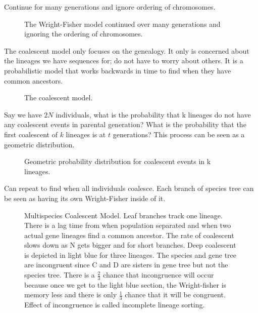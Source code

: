 \noindent Continue for many generations and ignore ordering of chromosomes.

\begin{figure} [ht!] 
  \centering 
  \caption{The Wright-Fisher model continued over many generations and
    ignoring the ordering of chromosomes.}
  \label{Fig14_FisherWrightManyGenerations}
\end{figure} 

The coalescent model only focuses on the genealogy. It only is
concerned about the lineages we have sequences for; do not have to
worry about others. It is a probabilistic model that works backwards
in time to find when they have common ancestors.

\begin{figure} [ht!] 
  \centering 
  \caption{The coalescent model.}
  \label{Fig15_CoalescentModel}
\end{figure} 

Say we have $2N$ individuals, what is the probability that k lineages
do not have any coalescent events in parental generation? What is the
probability that the first coalescent of $k$ lineages is at $t$
generations? This process can be seen as a geometric distribution.

\begin{figure} [ht!] 
  \centering 
  \caption{Geometric probability distribution for coalescent events in k lineages.}
  \label{Fig16_CoalescentProbDist}
\end{figure} 

\noindent Can repeat to find when all individuals coalesce. Each
branch of species tree can be seen as having its own Wright-Fisher
inside of it.

\begin{figure} [ht!] 
  \centering 
  \caption{Multispecies Coalescent Model. Leaf branches track one
    lineage. There is a lag time from when population separated and
    when two actual gene lineages find a common ancestor. The rate of
    coalescent slows down as N gets bigger and for short
    branches. Deep coalescent is depicted in light blue for three
    lineages. The species and gene tree are incongruent since C and D
    are sisters in gene tree but not the species tree. There is a
    $\frac{2}{3}$ chance that incongruence will occur because once we
    get to the light blue section, the Wright-fisher is memory less
    and there is only $\frac{1}{3}$ chance that it will be
    congruent. Effect of incongruence is called incomplete lineage
    sorting.}
  \label{Fig17_MultispeciesCoalescent}
\end{figure} 


